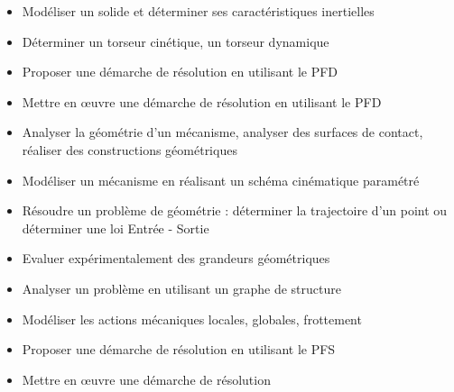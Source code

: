\begin{itemize}
\item  \footnotesize {} \normalsize \hspace{.2cm}Modéliser un solide et déterminer ses caractéristiques inertielles\hfill {}
\item  \footnotesize {} \normalsize \hspace{.2cm}Déterminer un torseur cinétique, un torseur dynamique\hfill {}
\item  \footnotesize {} \normalsize \hspace{.2cm}Proposer une démarche de résolution en utilisant le PFD\hfill {}
\item  \footnotesize {} \normalsize \hspace{.2cm}Mettre en œuvre une démarche de résolution en utilisant le PFD\hfill {}
\item  \footnotesize {} \normalsize \hspace{.2cm}Analyser la géométrie d'un mécanisme, analyser des surfaces de contact, réaliser des constructions géométriques\hfill {}
\item  \footnotesize {} \normalsize \hspace{.2cm}Modéliser un mécanisme en réalisant un schéma cinématique paramétré\hfill {}
\item  \footnotesize {} \normalsize \hspace{.2cm}Résoudre un problème de géométrie : déterminer la trajectoire d'un point ou déterminer une loi Entrée - Sortie\hfill {}
\item  \footnotesize {} \normalsize \hspace{.2cm}Evaluer expérimentalement des grandeurs géométriques\hfill {}
\item  \footnotesize {} \normalsize \hspace{.2cm}Analyser un problème en utilisant un graphe de structure\hfill {}
\item  \footnotesize {} \normalsize \hspace{.2cm}Modéliser les actions mécaniques locales, globales, frottement\hfill {}
\item  \footnotesize {} \normalsize \hspace{.2cm}Proposer une démarche de résolution en utilisant le PFS\hfill {}
\item  \footnotesize {} \normalsize \hspace{.2cm}Mettre en œuvre une démarche de résolution\hfill {}

\end{itemize}

